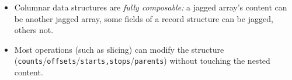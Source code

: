 \documentclass[aspectratio=169]{beamer}
\begin{document}
\begin{frame}{}
\Large
\vspace{1 cm}
\begin{itemize}\setlength{\itemsep}{0.5 cm}
\item<1-> Columnar data structures are {\it fully composable:} a jagged array's content can be another jagged array, some fields of a record structure can be jagged, others not.
\item<2-> Most operations (such as slicing) can modify the structure ({\tt counts}/{\tt offsets}/{\tt starts,stops}/{\tt parents}) without touching the nested content.
\end{itemize}
\end{frame}




\end{document}
